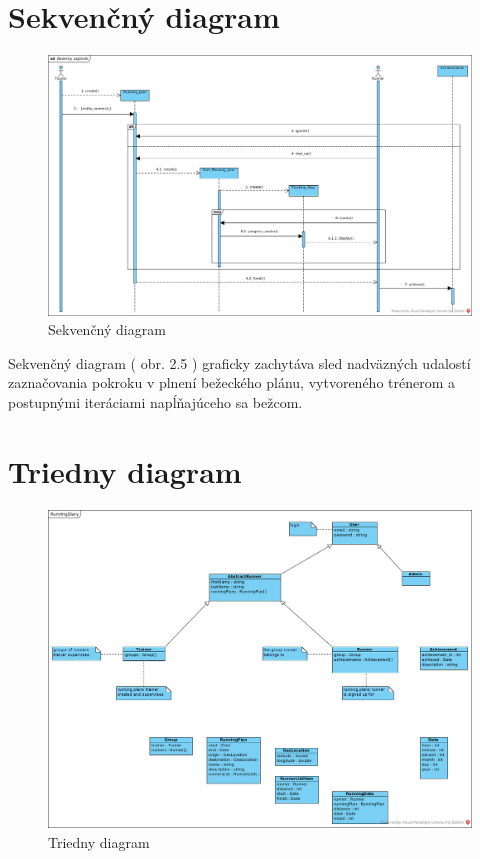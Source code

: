 \documentclass[12pt,a4paper]{report}
\theoremstyle{definition}
\theoremstyle{remark}
\begin{document}
\section{Sekvenčný diagram}
\begin{figure}[H]
\centering
\includegraphics[width=\textwidth]{Bezecky zapisnik.png}
\caption{Sekvenčný diagram}
\end{figure}

Sekvenčný diagram ( obr. 2.5 ) graficky zachytáva sled nadväzných udalostí zaznačovania pokroku v plnení bežeckého plánu, vytvoreného trénerom a postupnými iteráciami napĺňajúceho sa bežcom.

\newpage
\section{Triedny diagram}
\begin{figure}[H]
\centering
\includegraphics[width=\textwidth]{RunningDiary.png}
\caption{Triedny diagram}
\end{figure}
\end{document}
